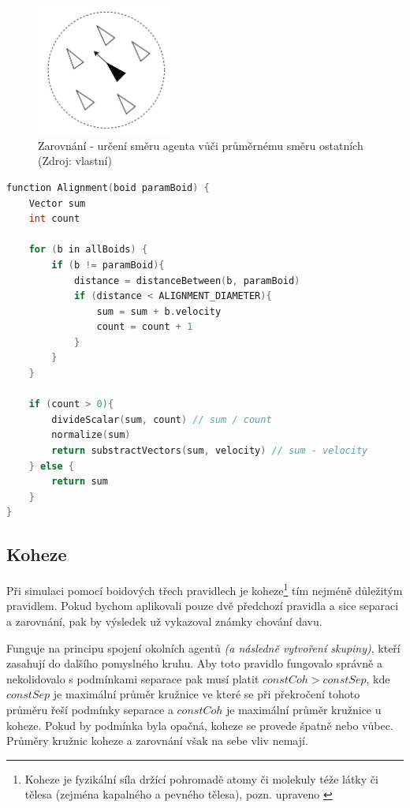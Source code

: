 \documentclass[czech,public,dept460,male,cpdeclaration]{diploma}
\begin{document}
\begin{figure}[H]\centering\includegraphics[width=0.4\textwidth]{Figures/alignment2.jpg}
	\caption{Zarovnání - určení směru agenta vůči průměrnému směru ostatních (Zdroj: vlastní)} \label{fig:zarovnani}
\end{figure}

\begin{lstlisting}[language=C++,label=src:Alignment pseudocode,caption=Pseudokód pro zarovnání (Zdroj: vlastní)]
function Alignment(boid paramBoid) {
	Vector sum
	int count
	
	for (b in allBoids) {
		if (b != paramBoid){
			distance = distanceBetween(b, paramBoid)
			if (distance < ALIGNMENT_DIAMETER){
				sum = sum + b.velocity
				count = count + 1
			}
		}
	}
	
	if (count > 0){
		divideScalar(sum, count) // sum / count
		normalize(sum)
		return substractVectors(sum, velocity) // sum - velocity
	} else {
		return sum
	}
}
\end{lstlisting}

\subsection{Koheze}\label{sec:koheze}
Při simulaci pomocí boidových třech pravidlech je koheze\footnote{Koheze je fyzikální síla držící pohromadě atomy či molekuly téže látky či tělesa (zejména
	kapalného a pevného tělesa), pozn. upraveno \cite{linkToCohesion}} tím nejméně důležitým pravidlem. Pokud bychom aplikovali pouze dvě předchozí pravidla a sice separaci a zarovnání, pak by výsledek už vykazoval známky chování davu.

Funguje na principu spojení okolních agentů \textit{(a následně vytvoření skupiny)}, kteří zasahují do dalšího pomyslného kruhu. Aby toto pravidlo fungovalo správně a nekolidovalo s podmínkami separace pak musí platit \(constCoh > constSep\), kde \(constSep\) je maximální průměr kružnice ve které se při překročení tohoto průměru řeší podmínky separace a \(constCoh\) je maximální průměr kružnice u koheze. Pokud by podmínka byla opačná, koheze se provede špatně nebo vůbec. Průměry kružnic koheze a zarovnání však na sebe vliv nemají.
\end{document}
